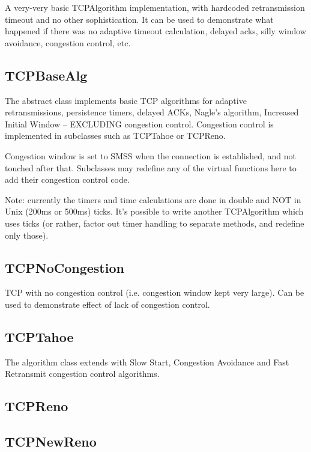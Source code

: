 A very-very basic TCPAlgorithm implementation, with hardcoded
retransmission timeout and no other sophistication. It can be
used to demonstrate what happened if there was no adaptive
timeout calculation, delayed acks, silly window avoidance,
congestion control, etc.

\subsection{TCPBaseAlg}

The abstract  class implements basic TCP
algorithms for adaptive retransmissions, persistence timers,
delayed ACKs, Nagle's algorithm, Increased Initial Window
-- EXCLUDING congestion control. Congestion control
is implemented in subclasses such as TCPTahoe or TCPReno.

Congestion window is set to SMSS when the connection is established,
and not touched after that. Subclasses may redefine any of the virtual
functions here to add their congestion control code.

\begin{note}
Note: currently the timers and time calculations are done in double
and NOT in Unix (200ms or 500ms) ticks. It's possible to write another
TCPAlgorithm which uses ticks (or rather, factor out timer handling to
separate methods, and redefine only those).
\end{note}

\subsection{TCPNoCongestion}

TCP with no congestion control (i.e. congestion window kept very large).
Can be used to demonstrate effect of lack of congestion control.

\subsection{TCPTahoe}

The  algorithm class extends 
with Slow Start, Congestion Avoidance and Fast Retransmit congestion
control algorithms.

\subsection{TCPReno}

\subsection{TCPNewReno}

